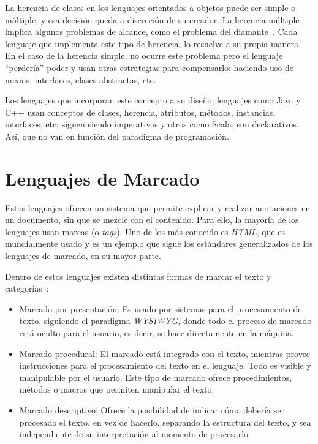 \documentclass[12pt,letterpaper,titlepage,oneside,openright]{book}
\begin{document}
\vfill

La herencia de clases en los lenguajes orientados a objetos puede ser simple o múltiple, y esa decisión queda a discreción de su creador. La herencia múltiple implica algunos problemas de alcance, como el problema del diamante~\cite{cargill1993case}. Cada lenguaje que implementa este tipo de herencia, lo resuelve a su propia manera. En el caso de la herencia simple, no ocurre este problema pero el lenguaje ``perdería'' poder y usan otras estrategias para compensarlo; haciendo uso de mixins, interfaces, clases abstractas, etc.

Los lenguajes que incorporan este concepto a su diseño, lenguajes como Java y C++ usan conceptos de clases, herencia, atributos, métodos, instancias, interfaces, etc; siguen siendo imperativos y otros como Scala, son declarativos. Así, que no van en función del paradigma de programación.

\section{Lenguajes de Marcado}

Estos lenguajes ofrecen un sistema que permite explicar y realizar anotaciones en un documento, sin que se mezcle con el contenido. Para ello, la mayoría de los lenguajes usan marcas (o \textit{tags}). Uno de los más conocido es \textit{HTML}, que es mundialmente usado y es un ejemplo que sigue los estándares generalizados de los lenguajes de marcado, en su mayor parte.

Dentro de estos lenguajes existen distintas formas de marcar el texto y categorías~\cite{coombs1987markup}:

\begin{itemize}
    \item Marcado por presentación: Es usado por sistemas para el procesamiento de texto, siguiendo el paradigma \textit{WYSIWYG}, donde todo el proceso de marcado está oculto para el usuario, es decir, se hace directamente en la máquina.

    \item Marcado procedural: El marcado está integrado con el texto, mientras provee instrucciones para el procesamiento del texto en el lenguaje. Todo es visible y manipulable por el usuario. Este tipo de marcado ofrece procedimientos, métodos o macros que permiten manipular el texto.

    \item Marcado descriptivo: Ofrece la posibilidad de indicar cómo debería ser procesado el texto, en vez de hacerlo, separando la estructura del texto, y sea independiente de su interpretación al momento de procesarlo.
\end{itemize}
\end{document}
